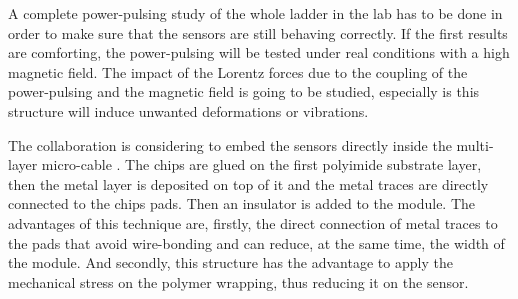 A complete power-pulsing study of the whole ladder in the lab has to be done in order to make sure that the sensors are still behaving correctly.
If the first results are comforting, the power-pulsing will be tested under real conditions with a high magnetic field.
The impact of the Lorentz forces due to the coupling of the power-pulsing and the magnetic field is going to be studied, especially is this structure will induce unwanted deformations or vibrations. 

The collaboration is considering to embed the sensors directly inside the multi-layer micro-cable \cite{Baudot2012}.
The chips are glued on the first polyimide substrate layer, then the metal layer is deposited on top of it and the metal traces are directly connected to the chips pads.
Then an insulator is added to the module.
The advantages of this technique are, firstly, the direct connection of metal traces to the pads that avoid wire-bonding and can reduce, at the same time, the width of the module.
And secondly, this structure has the advantage to apply the mechanical stress on the polymer wrapping, thus reducing it on the sensor.

